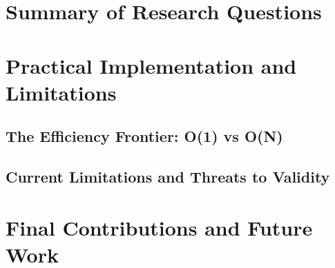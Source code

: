 \documentclass[a4paper,oneside,10pt,ngerman,english]{scrbook}
\begin{document}
\section{Summary of Research Questions}

\section{Practical Implementation and Limitations}
\subsection{The Efficiency Frontier: O(1) vs O(N)}

\subsection{Current Limitations and Threats to Validity}

\section{Final Contributions and Future Work}
\end{document}
